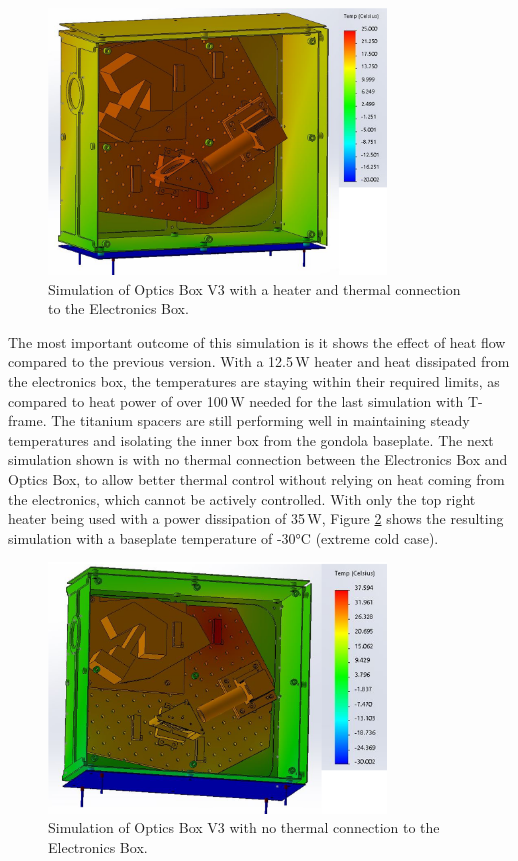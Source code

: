 \begin{figure}
    \centering
    \includegraphics[width=0.8\textwidth]{chap3_images/LIFE_V3_images/TA_-20_deg_20_deg_12W_heater_FIXED.png}
    \caption{Simulation of Optics Box V3 with a heater and thermal connection to the Electronics Box.}
    \label{fig:OB_V3_TA_1}
\end{figure}

The most important outcome of this simulation is it shows the effect of heat flow compared to the previous version. With a 12.5\,W heater and heat dissipated from the electronics box, the temperatures are staying within their required limits, as compared to heat power of over 100\,W needed for the last simulation with T-frame. The titanium spacers are still performing well in maintaining steady temperatures and isolating the inner box from the gondola baseplate. The next simulation shown is with no thermal connection between the Electronics Box and Optics Box, to allow better thermal control without relying on heat coming from the electronics, which cannot be actively controlled. With only the top right heater being used with a power dissipation of 35\,W, Figure \ref{fig:OB_V3_TA_2} shows the resulting simulation with a baseplate temperature of -30°C (extreme cold case).

\begin{figure}
    \centering
    \includegraphics[width=0.8\textwidth]{chap3_images/LIFE_V3_images/TA_-30_deg_35W_heater_FIXED.png}
    \caption{Simulation of Optics Box V3 with no thermal connection to the Electronics Box.}
    \label{fig:OB_V3_TA_2}
\end{figure}

